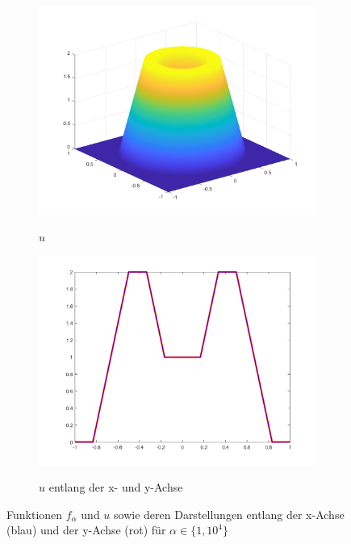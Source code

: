 \begin{figure}[p]
  \begin{subfigure}[b]{.48\linewidth}
    \centering
    \caption{$u$}
    \includegraphics[trim = 40 30 30 30, clip, width=\linewidth]
      {pictures/chapExperiments/secGeneralInfo/f01Plots/exactSolution.png}
    \label{fig:f01ExactSol}
  \end{subfigure}
  \quad
  \begin{subfigure}[b]{.48\linewidth}
    \centering
    \caption{$u$ entlang der x- und y-Achse}
    \includegraphics[trim = 50 30 50 20, clip, width=\linewidth]
      {pictures/chapExperiments/secGeneralInfo/f01Plots/exactSolutionAxis.png}
    \label{fig:f01ExactSolAxis}
  \end{subfigure} 
  \caption{Funktionen $f_\alpha$ und $u$ sowie deren
  Darstellungen entlang der x-Achse (blau) und der y-Achse (rot) für
  $\alpha\in\{1,10^4\}$}
  \label{fig:f01Plots}
\end{figure}
